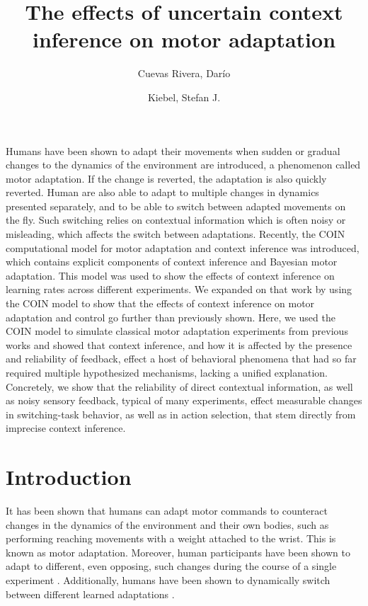 \documentclass[a4paper,doc,floatsintext,natbib]{apa6}%
\title{The effects of uncertain context inference on motor adaptation}
\author[1,2]{Cuevas Rivera, Darío}
\author[1,2]{Kiebel, Stefan J.}
\affil[1]{Chair of Neuroimaging, Faculty of Psychology, Technische Universität Dresden, 01062 Dresden, Germany.}
\affil[2]{Centre for Tactile Internet with Human-in-the-Loop (CeTI)}
\affiliation{~}
\begin{document}
\maketitle

Humans have been shown to adapt their movements when sudden or gradual changes to the dynamics of the environment are introduced, a phenomenon called motor adaptation. If the change is reverted, the adaptation is also quickly reverted. Human are also able to adapt to multiple changes in dynamics presented separately, and to be able to switch between adapted movements on the fly. Such switching relies on contextual information which is often noisy or misleading, which affects the switch between adaptations. Recently, the COIN computational model for motor adaptation and context inference was introduced, which contains explicit components of context inference and Bayesian motor adaptation. This model was used to show the effects of context inference on learning rates across different experiments. We expanded on that work by using the COIN model to show that the effects of context inference on motor adaptation and control go further than previously shown. Here, we used the COIN model to simulate classical motor adaptation experiments from previous works and showed that context inference, and how it is affected by the presence and reliability of feedback, effect a host of behavioral phenomena that had so far required multiple hypothesized mechanisms, lacking a unified explanation. Concretely, we show that the reliability of direct contextual information, as well as noisy sensory feedback, typical of many experiments, effect measurable changes in switching-task behavior, as well as in action selection, that stem directly from imprecise context inference. 


\section{Introduction}
It has been shown that humans can adapt motor commands to counteract changes in the dynamics of the environment and their own bodies, such as performing reaching movements with a weight attached to the wrist. This is known as motor adaptation. Moreover, human participants have been shown to adapt to different, even opposing, such changes during the course of a single experiment \citep{Gandolfo_Motor_1996,Shadmehr_Functional_1997}. Additionally, humans have been shown to dynamically switch between different learned adaptations \citep{Davidson_Scaling_2004,Ethier_Spontaneous_2008,Lee_Dual_2009}.
\end{document}
